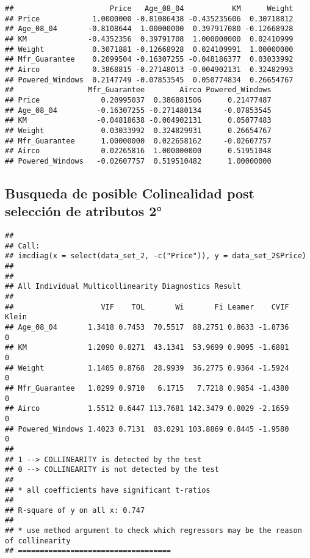 \documentclass[]{article}
\newenvironment{Shaded}{\begin{snugshade}}{\end{snugshade}}
\newcommand{\DecValTok}[1]{\textcolor[rgb]{0.00,0.00,0.81}{#1}}
\newcommand{\KeywordTok}[1]{\textcolor[rgb]{0.13,0.29,0.53}{\textbf{#1}}}
\newcommand{\NormalTok}[1]{#1}
\newcommand{\OperatorTok}[1]{\textcolor[rgb]{0.81,0.36,0.00}{\textbf{#1}}}
\newcommand{\StringTok}[1]{\textcolor[rgb]{0.31,0.60,0.02}{#1}}
\begin{document}
\begin{verbatim}
##                      Price   Age_08_04           KM      Weight
## Price            1.0000000 -0.81086438 -0.435235606  0.30718812
## Age_08_04       -0.8108644  1.00000000  0.397917080 -0.12668928
## KM              -0.4352356  0.39791708  1.000000000  0.02410999
## Weight           0.3071881 -0.12668928  0.024109991  1.00000000
## Mfr_Guarantee    0.2099504 -0.16307255 -0.048186377  0.03033992
## Airco            0.3868815 -0.27148013 -0.004902131  0.32482993
## Powered_Windows  0.2147749 -0.07853545  0.050774834  0.26654767
##                 Mfr_Guarantee        Airco Powered_Windows
## Price              0.20995037  0.386881506      0.21477487
## Age_08_04         -0.16307255 -0.271480134     -0.07853545
## KM                -0.04818638 -0.004902131      0.05077483
## Weight             0.03033992  0.324829931      0.26654767
## Mfr_Guarantee      1.00000000  0.022658162     -0.02607757
## Airco              0.02265816  1.000000000      0.51951048
## Powered_Windows   -0.02607757  0.519510482      1.00000000
\end{verbatim}

\hypertarget{busqueda-de-posible-colinealidad-post-seleccion-de-atributos-2}{%
\subsection{Busqueda de posible Colinealidad post selección de atributos
2°}\label{busqueda-de-posible-colinealidad-post-seleccion-de-atributos-2}}

\begin{Shaded}
\end{Shaded}

\begin{verbatim}
## 
## Call:
## imcdiag(x = select(data_set_2, -c("Price")), y = data_set_2$Price)
## 
## 
## All Individual Multicollinearity Diagnostics Result
## 
##                    VIF    TOL       Wi       Fi Leamer    CVIF Klein
## Age_08_04       1.3418 0.7453  70.5517  88.2751 0.8633 -1.8736     0
## KM              1.2090 0.8271  43.1341  53.9699 0.9095 -1.6881     0
## Weight          1.1405 0.8768  28.9939  36.2775 0.9364 -1.5924     0
## Mfr_Guarantee   1.0299 0.9710   6.1715   7.7218 0.9854 -1.4380     0
## Airco           1.5512 0.6447 113.7681 142.3479 0.8029 -2.1659     0
## Powered_Windows 1.4023 0.7131  83.0291 103.8869 0.8445 -1.9580     0
## 
## 1 --> COLLINEARITY is detected by the test 
## 0 --> COLLINEARITY is not detected by the test
## 
## * all coefficients have significant t-ratios
## 
## R-square of y on all x: 0.747 
## 
## * use method argument to check which regressors may be the reason of collinearity
## ===================================
\end{verbatim}
\end{document}
